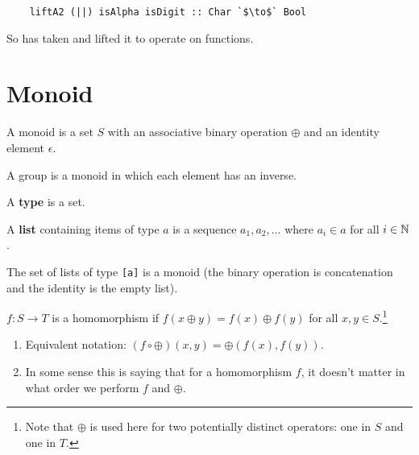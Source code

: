 \documentclass[12pt]{article}
\newcommand{\op}{\oplus}
\newcommand{\id}{\epsilon}
\begin{document}
\begin{example*}
\begin{enumerate}
    \begin{verbatim}
    liftA2 (||) isAlpha isDigit :: Char `$\to$` Bool
    \end{verbatim}

    So  has taken \mih{||} and lifted it to operate on  functions.

  \end{enumerate}
\end{example*}


\section{Monoid}

\begin{definition*}
  A monoid is a set $S$ with an associative binary operation $\op$ and an identity element $\id$.
\end{definition*}

\begin{remark*}
  A group is a monoid in which each element has an inverse.
\end{remark*}

\begin{definition*}
  A {\bf type} is a set.
\end{definition*}

\begin{definition*}
  A {\bf list} containing items of type $a$ is a sequence $a_1, a_2, \ldots$ where $a_i \in a$ for
  all $i \in \mathbb{N}$.
\end{definition*}

\begin{example*}\hspace{0pt}
  The set of lists of type \texttt{[a]} is a monoid (the binary operation is
  concatenation and the identity is the empty list).
\end{example*}

\begin{definition*}
  $f:S \to T$ is a homomorphism if $f(x \op y) = f(x) \op f(y)$ for all $x, y \in S$.\footnote{Note that $\op$ is used here for two potentially distinct operators: one in $S$ and one
    in $T$.}
\end{definition*}

\begin{remark*}\hspace{0pt}
  \begin{enumerate}
  \item Equivalent notation: $(f \circ \op)(x, y) = \op(f(x), f(y))$.
  \item In some sense this is saying that for a homomorphism $f$, it doesn't matter in what order
    we perform $f$ and $\op$.
  \end{enumerate}

\end{remark*}
\end{document}
